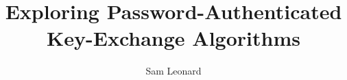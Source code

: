\documentclass[12pt, a4paper]{third-rep}
\title{Exploring Password-Authenticated Key-Exchange Algorithms}
\author{Sam Leonard}
\begin{document}
\dotitleandabstract

\tableofcontents







\printnoidxglossaries{}

%              

       
\nocite{*}

                                
\appendix


\end{document}
